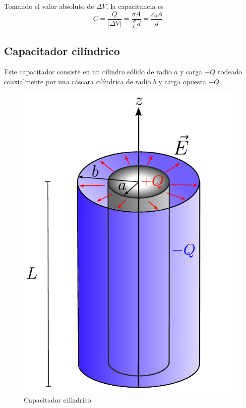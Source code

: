 Tomando el valor absoluto de $\Delta V$, la capacitancia es
$$C = \frac{Q}{|\Delta V|} = \frac{\sigma A}{\frac{\sigma}{\varepsilon_0} d} = \frac{\varepsilon_0 A}{d}.$$

\subsection*{Capacitador cilíndrico}

Este capacitador consiste en un cilindro sólido de radio $a$ y carga $+Q$ rodeado coaxialmente por una cáscara cilíndrica de radio $b$ y carga opuesta $-Q$. 

\begin{figure}[H]
    \centering
    \includegraphics[scale = 0.7]{Figuras/Capacitador-Cilindrico.pdf}
    \caption{Capacitador cilíndrico.}
    \label{fig:Cap-Cilindrico}
\end{figure}

